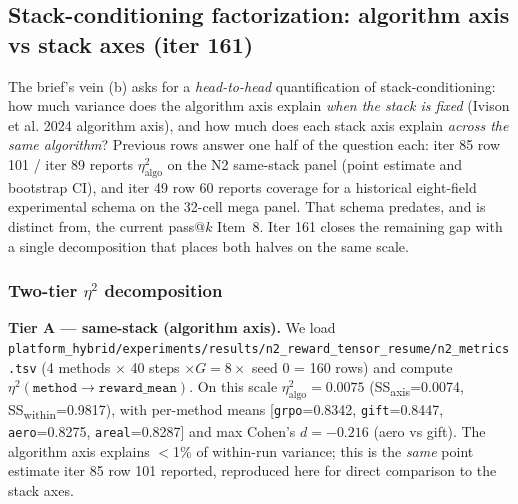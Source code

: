 \subsection{Stack-conditioning factorization: algorithm axis vs stack axes (iter 161)}
\label{sec:p5-iter161-stack-factorization}

The brief's vein (b) asks for a \emph{head-to-head} quantification of
stack-conditioning: how much variance does the algorithm axis explain
\emph{when the stack is fixed} (Ivison et al. 2024 algorithm axis), and
how much does each stack axis explain \emph{across the same algorithm}?
Previous rows answer one half of the question each: iter 85 row 101 /
iter 89 reports $\eta^2_{\mathrm{algo}}$ on the N2 same-stack panel
(point estimate and bootstrap CI), and iter 49 row 60 reports coverage for a
historical eight-field experimental schema on the 32-cell mega panel. That
schema predates, and is distinct from, the current pass@$k$ Item~8. Iter 161 closes the
remaining gap with a single decomposition that places both halves on
the same scale.

\subsubsection{Two-tier \texorpdfstring{$\eta^2$}{eta\textasciicircum 2} decomposition}
\label{sec:p5-iter161-two-tier}
\textbf{Tier A --- same-stack (algorithm axis).} We load
\texttt{platform_hybrid/experiments/results/n2\_reward\_tensor\_resume/n2\_metrics.tsv}
(4 methods $\times$ 40 steps $\times G{=}8 \times$ seed 0 = 160 rows)
and compute $\eta^2(\texttt{method} \to \texttt{reward\_mean})$. On
this scale \textbf{$\eta^2_{\mathrm{algo}} = 0.0075$} (SS\textsubscript{axis}=0.0074,
SS\textsubscript{within}=0.9817), with per-method means
[\texttt{grpo}=0.8342, \texttt{gift}=0.8447, \texttt{aero}=0.8275,
\texttt{areal}=0.8287] and max Cohen's $d{=}{-}0.216$ (aero vs gift).
The algorithm axis explains $<$1\% of within-run variance; this is the
\emph{same} point estimate iter 85 row 101 reported, reproduced here
for direct comparison to the stack axes.

